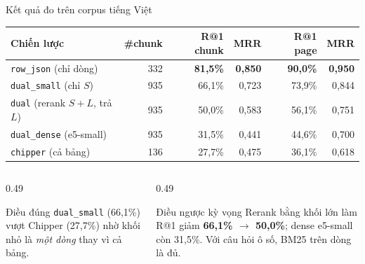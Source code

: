\documentclass[aspectratio=169,10pt]{beamer}
\begin{document}
\begin{frame}{Kết quả đo trên corpus tiếng Việt}
  \centering\footnotesize
  \begin{tabular}{@{}l r rr rr@{}}
    \toprule
    \textbf{Chiến lược} & \textbf{\#chunk} &
    \textbf{R@1 chunk} & \textbf{MRR} &
    \textbf{R@1 page} & \textbf{MRR} \\
    \midrule
    \texttt{row\_json} (chỉ dòng) & 332 & \textbf{81,5\%} & \textbf{0,850} & \textbf{90,0\%} & \textbf{0,950} \\
    \texttt{dual\_small} (chỉ $S$) & 935 & 66,1\% & 0,723 & 73,9\% & 0,844 \\
    \texttt{dual} (rerank $S+L$, trả $L$) & 935 & 50,0\% & 0,583 & 56,1\% & 0,751 \\
    \texttt{dual\_dense} (e5-small) & 935 & 31,5\% & 0,441 & 44,6\% & 0,700 \\
    \texttt{chipper} (cả bảng) & 136 & 27,7\% & 0,475 & 36,1\% & 0,618 \\
    \bottomrule
  \end{tabular}
  \vspace{0.5em}
  \begin{columns}[T]
    \begin{column}{0.49\textwidth}
      \begin{block}{\small Điều đúng}
        \texttt{dual\_small} (66,1\%) vượt Chipper (27,7\%) nhờ khối nhỏ là
        \emph{một dòng} thay vì cả bảng.
      \end{block}
    \end{column}
    \begin{column}{0.49\textwidth}
      \begin{alertblock}{\small Điều ngược kỳ vọng}
        Rerank bằng khối lớn làm R@1 giảm \textbf{66,1\% $\to$ 50,0\%}; dense
        e5-small còn 31,5\%. Với câu hỏi ô số, BM25 trên dòng là đủ.
      \end{alertblock}
    \end{column}
  \end{columns}
\end{frame}
\end{document}
